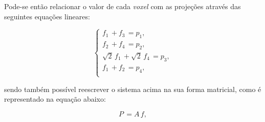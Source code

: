 Pode-se então relacionar o valor de cada \textit{voxel} com as projeções através das seguintes equações lineares:

\begin{equation}
\begin{cases}
f_{1} \, + f_{3} \, = p_{1}, \\ 
f_{2} \, + f_{4} \, = p_{2}, \\ 
\sqrt{2} \, f_{1} \, + \sqrt{2} \, f_{4} \, = p_{3}, \\ 
f_{1} \, + f_{2} \, = p_{4}, \\ 
\end{cases}
\label{eq:eqCap3EquacoesLineares}
\end{equation} 

\noindent sendo também possível reescrever o sistema acima na sua forma matricial, como é representado na equação abaixo:

\begin{equation}
P \, = A \, f,
\label{eq:eqCap3MatrizEquacoesLineares1}
\end{equation}

